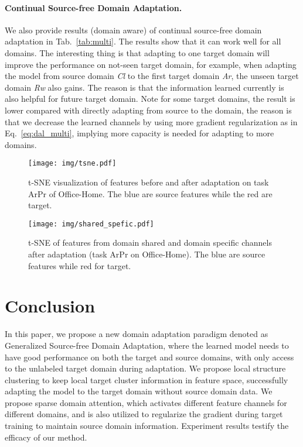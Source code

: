 \documentclass[10pt,twocolumn,letterpaper]{article}
\begin{document}
\vspace{-2mm}
\paragraph{Continual Source-free Domain Adaptation.}
We also provide results (domain aware) of continual source-free domain adaptation in Tab.~\ref{tab:multi}. The results show that it can work well for all domains. The interesting thing is that adapting to one target domain will improve the performance on not-seen target domain, for example, when adapting the model from source domain \emph{Cl} to the first target domain \emph{Ar}, the unseen target domain \emph{Rw} also gains. The reason is that the information learned currently is also helpful for future target domain. Note for some target domains, the result is lower compared with directly adapting from source to the domain, the reason is that we decrease the learned channels by using more gradient regularization as in Eq.~\ref{eq:dal_multi}, implying more capacity is needed for adapting to more domains.

\begin{figure}[!tbp]
	\centering
	\texttt{[image: img/tsne.pdf]}\vspace{-3mm}
	\caption{t-SNE visualization of features before and after adaptation on task ArPr of Office-Home. The blue are source features while the red are target.\vspace{-2mm}}
	\label{fig:tsne}
	\vspace{-2mm}
\end{figure}

\begin{figure}[!tbp]
	\centering
	\texttt{[image: img/shared\_spefic.pdf]}\vspace{-3mm}
	\caption{t-SNE of features from domain shared and domain specific channels after adaptation (task ArPr on Office-Home). The blue are source features while red for target.\vspace{-2mm}}
	\label{fig:tsne_ss}
	\vspace{-6mm}
\end{figure}

\vspace{-2mm}
\section{Conclusion}
In this paper, we propose a new domain adaptation paradigm denoted as Generalized Source-free Domain Adaptation, where the learned model needs to have good performance on both the target and source domains, with only access to the unlabeled target domain during adaptation. We propose local structure clustering to keep local target cluster information in feature space, successfully adapting the model to the target domain without source domain data. We propose sparse domain attention, which activates different feature channels for different domains, and is also utilized to regularize the gradient during target training to maintain source domain information. 
Experiment results testify the efficacy of our method.
\end{document}
